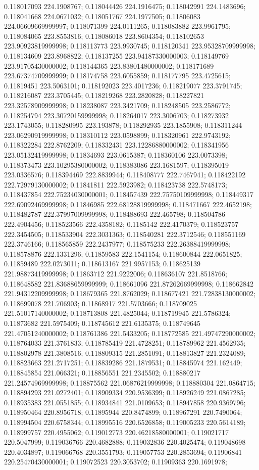 0.118017093 224.1908767; 0.118044426 224.1916475; 0.118042991 224.1483696; 0.118041668 224.0671032; 0.118051767 224.1977505; 0.11806083 224.06609669999997; 0.118071399 224.0111265; 0.118083882 223.9961795; 0.118084065 223.8553816; 0.118086018 223.8604354; 0.118102653 223.90923819999998; 0.118113773 223.9930745; 0.118120341 223.95328709999998; 0.118134609 223.8968822; 0.118137255 223.94187330000003; 0.118149769 223.91705430000002; 0.118144365 223.83801480000002; 0.118171689 223.67374709999999; 0.118174758 223.6055859; 0.118177795 223.4725615; 0.11819451 223.5063101; 0.118192023 223.4017236; 0.118219077 223.3791745; 0.118216087 223.3705445; 0.118219268 223.2820828; 0.118227821 223.32578909999998; 0.118238087 223.3421709; 0.118248505 223.2586772; 0.118254794 223.30720159999998; 0.118264017 223.3006703; 0.118273932 223.1743055; 0.118280995 223.193878; 0.118292935 223.1855908; 0.118311244 223.06290919999998; 0.118310112 223.0598899; 0.118320961 222.9743192; 0.118322284 222.8762209; 0.118332431 223.12286880000002; 0.118341956 223.05132419999998; 0.11834693 223.0615387; 0.118360106 223.0073398; 0.118373473 223.10295380000002; 0.118383086 223.1681597; 0.118395019 223.0336576; 0.118394469 222.8839944; 0.118408777 222.7467941; 0.118422192 222.72979130000002; 0.11841811 222.5923982; 0.118423738 222.5748173; 0.118437854 222.75234030000001; 0.118457439 222.75750109999998; 0.118449317 222.69092469999998; 0.11846985 222.68128819999998; 0.118471667 222.4652198; 0.118482787 222.37997009999998; 0.118488693 222.465798; 0.118504786 222.4904456; 0.118523566 222.4358182; 0.1185142 222.4170379; 0.118523757 222.3454505; 0.118533904 222.3031363; 0.118540281 222.3712546; 0.118551169 222.3746166; 0.118565859 222.2437977; 0.118575233 222.26388419999998; 0.118578876 222.1331296; 0.11859583 222.1541154; 0.118600844 222.0651825; 0.11859489 222.0273011; 0.118613167 221.9957153; 0.118625139 221.98873419999998; 0.11863712 221.9222006; 0.118636107 221.8518766; 0.118648582 221.83688659999999; 0.118661096 221.87262669999998; 0.118662842 221.94312209999998; 0.118679365 221.8762029; 0.118677421 221.72838130000002; 0.118699078 221.706903; 0.11868917 221.5703666; 0.118709025 221.51017140000002; 0.118713808 221.4825044; 0.118719945 221.5786324; 0.11873682 221.5975409; 0.118745612 221.6135375; 0.118749645 221.47051240000002; 0.118761386 221.5433205; 0.118772585 221.49747290000002; 0.118764033 221.3761833; 0.118785419 221.4728251; 0.118789962 221.4562935; 0.118802978 221.3808516; 0.118809315 221.2851091; 0.118813827 221.2324089; 0.118823663 221.2717251; 0.118839286 221.1879531; 0.118845974 221.162449; 0.118845854 221.066321; 0.118856551 221.2345502; 0.118880217 221.24574969999998; 0.118875562 221.06876219999998; 0.118880304 221.0864715; 0.118894293 221.0272401; 0.118909334 220.9536399; 0.118926249 221.0867285; 0.118935383 221.0551855; 0.118934841 221.0109653; 0.118947858 220.9369796; 0.118950464 220.8956718; 0.11895944 220.8474899; 0.118967291 220.7490064; 0.118994504 220.6758344; 0.118995516 220.6526858; 0.119005233 220.5614189; 0.118999757 220.4955062; 0.119012773 220.46218580000001; 0.119021717 220.5047999; 0.119036766 220.4682888; 0.119032836 220.4025474; 0.119048698 220.4034897; 0.119066768 220.3551793; 0.119057753 220.2853694; 0.11906841 220.25470430000001; 0.119072523 220.3053702; 0.11909363 220.1691978; 